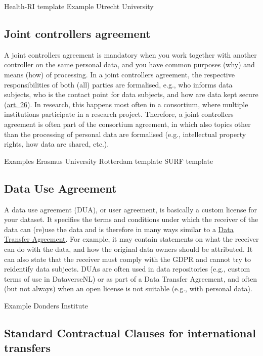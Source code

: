 \documentclass[
]{book}
\begin{document}
Health-RI template
Example Utrecht University

\hypertarget{joint-controller-agreement}{%
\subsection{Joint controllers agreement}\label{joint-controller-agreement}}

A joint controllers agreement is mandatory when you work together with another
controller on the same personal data, and you have common purposes (why) and
means (how) of processing. In a joint controllers agreement, the respective
responsibilities of both (all) parties are formalised, e.g., who informs data
subjects, who is the contact point for data subjects, and how are data kept
secure (\href{https://gdpr-info.eu/art-26-gdpr/}{art. 26}).
In research, this happens most often in a consortium, where multiple institutions
participate in a research project. Therefore, a joint controllers agreement is
often part of the consortium agreement, in which also topics other than the
processing of personal data are formalised (e.g., intellectual property rights,
how data are shared, etc.).

Examples
Erasmus University Rotterdam template
SURF template

\hypertarget{user-agreement}{%
\subsection{Data Use Agreement}\label{user-agreement}}

A data use agreement (DUA), or user agreement, is basically a custom license for
your dataset. It specifies the terms and conditions under which the receiver of
the data can (re)use the data and is therefore in many ways similar to a
\protect\hyperlink{data-transfer-agreement}{Data Transfer Agreement}. For example,
it may contain statements on what the receiver can do with the data, and how
the original data owners should be attributed. It can also state that the
receiver must comply with the GDPR and cannot try to reidentify data subjects.
DUAs are often used in data repositories (e.g., custom terms of use in
DataverseNL) or as part of a Data Transfer Agreement, and often (but not always)
when an open license is not suitable (e.g., with personal data).

Example Donders Institute

\hypertarget{scc}{%
\subsection{Standard Contractual Clauses for international transfers}\label{scc}}
\end{document}
